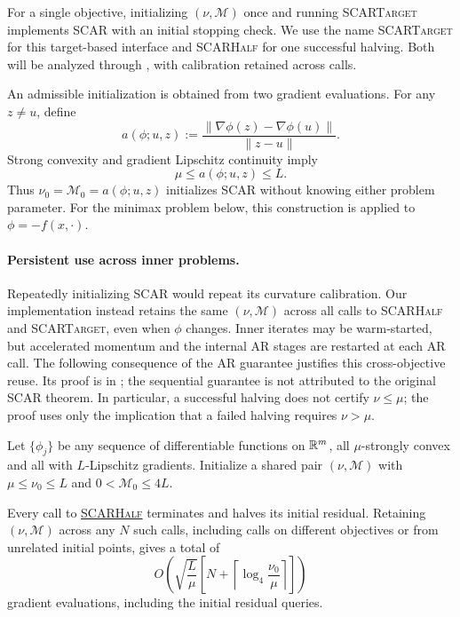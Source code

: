 \documentclass{article}
\begin{document}
For a single objective, initializing $(\nu,\mathcal M)$ once and
running \textsc{SCARTarget} implements SCAR with an initial stopping
check.  We use the name \textsc{SCARTarget} for this target-based
interface and \textsc{SCARHalf} for one successful halving.  Both
will be analyzed through , with calibration
retained across calls.

An admissible initialization is obtained from two gradient evaluations.
For any $z\ne u$, define
\begin{equation}\label{eq:secant-estimate-pf}
 a(\phi;u,z):=
 \frac{\|\nabla\phi(z)-\nabla\phi(u)\|}{\|z-u\|}.
\end{equation}
Strong convexity and gradient Lipschitz continuity imply
\begin{equation}\label{eq:secant-bounds-pf}
 \mu\le a(\phi;u,z)\le L.
\end{equation}
Thus $\nu_0=\mathcal M_0=a(\phi;u,z)$ initializes SCAR without
knowing either problem parameter.  For the minimax problem below, this
construction is applied to $\phi=-f(x,\cdot)$.

\paragraph{Persistent use across inner problems.}
Repeatedly initializing SCAR would repeat its curvature calibration.
Our implementation instead retains the same $(\nu,\mathcal M)$ across
all calls to \textsc{SCARHalf} and \textsc{SCARTarget}, even when
$\phi$ changes.  Inner iterates may be warm-started, but accelerated
momentum and the internal AR stages are restarted at each AR call.
The following consequence of the AR guarantee justifies this
cross-objective reuse.  Its proof is in ;
the sequential guarantee is not attributed to the original SCAR
theorem.  In particular, a successful halving does not certify
$\nu\le\mu$; the proof uses only the implication that a failed
halving requires $\nu>\mu$.

\begin{lemma}
\label{lem:scar-persistent-half}
Let $\{\phi_j\}$ be any sequence of differentiable functions on
$\mathbb{R}^m$, all $\mu$-strongly convex and all with $L$-Lipschitz
gradients.  Initialize a shared pair $(\nu,\mathcal M)$ with
$\mu\le\nu_0\le L$ and $0<\mathcal M_0\le4L$.

Every call to
\hyperref[proc:scar-half]{\textnormal{\textsc{SCARHalf}}}
terminates and halves its initial residual.  Retaining
$(\nu,\mathcal M)$ across any $N$ such calls, including calls on
different objectives or from unrelated initial points, gives a total of
\begin{equation}\label{eq:persistent-scar-count}
 O\!\left(\sqrt{\frac L\mu}\left[
 N+\left\lceil\log_4\frac{\nu_0}{\mu}\right\rceil
 \right]\right)
\end{equation}
gradient evaluations, including the initial residual queries.
\end{lemma}
\end{document}
